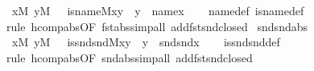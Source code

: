 \begin{isabellebody}
\ \ {\isachardoublequoteopen}{\isasymlbrakk}x{\isasymin}M{\isacharsemicolon}{\kern0pt}\ y{\isasymin}M\ {\isasymrbrakk}\ {\isasymLongrightarrow}\ is{\isacharunderscore}{\kern0pt}name{}{\isacharparenleft}{\kern0pt}{\isacharhash}{\kern0pt}{\isacharhash}{\kern0pt}M{\isacharcomma}{\kern0pt}x{\isacharcomma}{\kern0pt}y{\isacharparenright}{\kern0pt}\ {\isasymlongleftrightarrow}\ y\ {\isacharequal}{\kern0pt}\ name{}{\isacharparenleft}{\kern0pt}x{\isacharparenright}{\kern0pt}{\isachardoublequoteclose}\isanewline
%
\isadelimproof
\ \ %
\endisadelimproof
%
\isatagproof
{}\isamarkupfalse%
\ name{}{\isacharunderscore}{\kern0pt}def\ is{\isacharunderscore}{\kern0pt}name{}{\isacharunderscore}{\kern0pt}def\isanewline
\ \ \isamarkupfalse%
\ {\isacharparenleft}{\kern0pt}rule\ hcomp{\isacharunderscore}{\kern0pt}abs{\isacharbrackleft}{\kern0pt}OF\ fst{\isacharunderscore}{\kern0pt}abs{\isacharbrackright}{\kern0pt}{\isacharsemicolon}{\kern0pt}simp{\isacharunderscore}{\kern0pt}all\ add{\isacharcolon}{\kern0pt}fst{\isacharunderscore}{\kern0pt}snd{\isacharunderscore}{\kern0pt}closed{\isacharparenright}{\kern0pt}%
\endisatagproof
{\isafoldproof}%
%
\isadelimproof
\isanewline
%
\endisadelimproof
\isanewline
{}\isamarkupfalse%
\ snd{\isacharunderscore}{\kern0pt}snd{\isacharunderscore}{\kern0pt}abs{\isacharcolon}{\kern0pt}\isanewline
\ \ {\isachardoublequoteopen}{\isasymlbrakk}x{\isasymin}M{\isacharsemicolon}{\kern0pt}\ y{\isasymin}M\ {\isasymrbrakk}\ {\isasymLongrightarrow}\ is{\isacharunderscore}{\kern0pt}snd{\isacharunderscore}{\kern0pt}snd{\isacharparenleft}{\kern0pt}{\isacharhash}{\kern0pt}{\isacharhash}{\kern0pt}M{\isacharcomma}{\kern0pt}x{\isacharcomma}{\kern0pt}y{\isacharparenright}{\kern0pt}\ {\isasymlongleftrightarrow}\ y\ {\isacharequal}{\kern0pt}\ snd{\isacharparenleft}{\kern0pt}snd{\isacharparenleft}{\kern0pt}x{\isacharparenright}{\kern0pt}{\isacharparenright}{\kern0pt}{\isachardoublequoteclose}\isanewline
%
\isadelimproof
\ \ %
\endisadelimproof
%
\isatagproof
{}\isamarkupfalse%
\ is{\isacharunderscore}{\kern0pt}snd{\isacharunderscore}{\kern0pt}snd{\isacharunderscore}{\kern0pt}def\isanewline
\ \ \isamarkupfalse%
\ {\isacharparenleft}{\kern0pt}rule\ hcomp{\isacharunderscore}{\kern0pt}abs{\isacharbrackleft}{\kern0pt}OF\ snd{\isacharunderscore}{\kern0pt}abs{\isacharbrackright}{\kern0pt}{\isacharsemicolon}{\kern0pt}simp{\isacharunderscore}{\kern0pt}all\ add{\isacharcolon}{\kern0pt}fst{\isacharunderscore}{\kern0pt}snd{\isacharunderscore}{\kern0pt}closed{\isacharparenright}{\kern0pt}%

\end{isabellebody}

